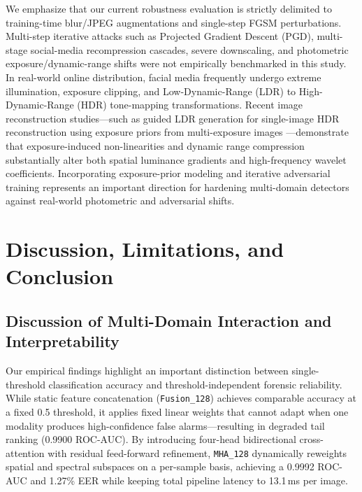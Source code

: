 \documentclass[fleqn,10pt]{wlscirep}
\begin{document}
We emphasize that our current robustness evaluation is strictly delimited to training-time blur/JPEG augmentations and single-step FGSM perturbations. Multi-step iterative attacks such as Projected Gradient Descent (PGD), multi-stage social-media recompression cascades, severe downscaling, and photometric exposure/dynamic-range shifts were not empirically benchmarked in this study. In real-world online distribution, facial media frequently undergo extreme illumination, exposure clipping, and Low-Dynamic-Range (LDR) to High-Dynamic-Range (HDR) tone-mapping transformations. Recent image reconstruction studies---such as guided LDR generation for single-image HDR reconstruction using exposure priors from multi-exposure images \cite{ref38}---demonstrate that exposure-induced non-linearities and dynamic range compression substantially alter both spatial luminance gradients and high-frequency wavelet coefficients. Incorporating exposure-prior modeling and iterative adversarial training represents an important direction for hardening multi-domain detectors against real-world photometric and adversarial shifts.

\section*{Discussion, Limitations, and Conclusion}
\subsection*{Discussion of Multi-Domain Interaction and Interpretability}
Our empirical findings highlight an important distinction between single-threshold classification accuracy and threshold-independent forensic reliability. While static feature concatenation (\texttt{Fusion\_128}) achieves comparable accuracy at a fixed 0.5 threshold, it applies fixed linear weights that cannot adapt when one modality produces high-confidence false alarms---resulting in degraded tail ranking (0.9900 ROC-AUC). By introducing four-head bidirectional cross-attention with residual feed-forward refinement, \texttt{MHA\_128} dynamically reweights spatial and spectral subspaces on a per-sample basis, achieving a 0.9992 ROC-AUC and 1.27\% EER while keeping total pipeline latency to 13.1\,ms per image.
\end{document}
